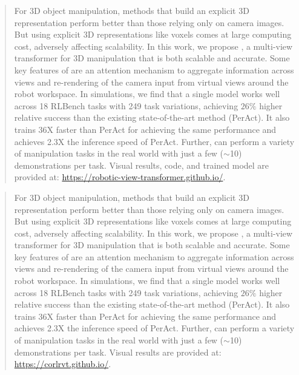 \makeatletter
\makeatother
\maketitle

\ifarxiv
    \begin{abstract}
    For 3D object manipulation, methods that build an explicit 3D representation perform better than those relying only on camera images. But using explicit 3D representations like voxels comes at large computing cost, adversely affecting scalability. In this work, we propose \method, a multi-view transformer for 3D manipulation that is both scalable and accurate. Some key features of \method are an attention mechanism to aggregate information across views and re-rendering of the camera input from virtual views around the robot workspace. In simulations, we find that a single \method model works well across 18 RLBench tasks with 249 task variations, achieving $26\%$ higher relative success than the existing state-of-the-art method (PerAct). It also trains 36X faster than PerAct for achieving the same performance and achieves 2.3X the inference speed of PerAct. Further, \method can perform a variety of manipulation tasks in the real world with just a few ($\sim$10) demonstrations per task. Visual results, code, and trained model are provided at: \href{https://robotic-view-transformer.github.io/}{https://robotic-view-transformer.github.io/}.
    \end{abstract}
\else
    \begin{abstract}
    For 3D object manipulation, methods that build an explicit 3D representation perform better than those relying only on camera images. But using explicit 3D representations like voxels comes at large computing cost, adversely affecting scalability. In this work, we propose \method, a multi-view transformer for 3D manipulation that is both scalable and accurate. Some key features of \method are an attention mechanism to aggregate information across views and re-rendering of the camera input from virtual views around the robot workspace. In simulations, we find that a single \method model works well across 18 RLBench tasks with 249 task variations, achieving $26\%$ higher relative success than the existing state-of-the-art method (PerAct). It also trains 36X faster than PerAct for achieving the same performance and achieves 2.3X the inference speed of PerAct. Further, \method can perform a variety of manipulation tasks in the real world with just a few ($\sim$10) demonstrations per task. Visual results are provided at: \href{https://corlrvt.github.io/}{https://corlrvt.github.io/}.
    \end{abstract}
\fi